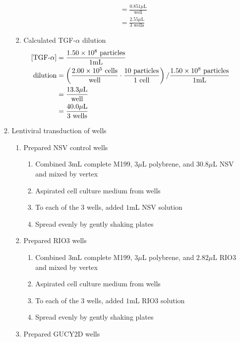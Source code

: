 \begin{enumerate}
\begin{enumerate}
\begin{enumerate}
\begin{align*}
							&= \frac{0.851\mu\text{L}}{\text{well}}\\
							&= \frac{2.55\mu\text{L}}{3\text{ wells}}
						\end{align*}
					\item Calculated TGF-$\alpha$ dilution
							\begin{align*}
							\text{[TGF-$\alpha$]} &= \frac{1.50\times 10^{8}\text{ particles}}{1\text{mL}}\\
							\text{dilution}&= \left(\frac{2.00\times 10^{5}\text{ cells}}{\text{well}}\cdot \frac{10\text{ particles}}{1\text{ cell}}\right)/\frac{1.50\times 10^{8}\text{ particles}}{1\text{mL}}\\
							&= \frac{13.3\mu\text{L}}{\text{well}}\\
							&= \frac{40.0\mu\text{L}}{3\text{ wells}}
						\end{align*}
				\end{enumerate}
			\item Lentiviral transduction of wells
				\begin{enumerate}
					\item Prepared NSV control wells
						\begin{enumerate}
							\item Combined $3$mL complete M199, $3\mu$L polybrene, and $30.8\mu$L NSV and mixed by vertex
							\item Aspirated cell culture medium from wells
							\item To each of the 3 wells, added $1$mL NSV solution
							\item Spread evenly by gently shaking plates
						\end{enumerate}
					\item Prepared RIO3 wells
						\begin{enumerate}
							\item Combined $3$mL complete M199, $3\mu$L polybrene, and $2.82\mu$L RIO3 and mixed by vertex
							\item Aspirated cell culture medium from wells
							\item To each of the 3 wells, added $1$mL RIO3 solution
							\item Spread evenly by gently shaking plates
						\end{enumerate}
					\item Prepared GUCY2D wells
						\begin{enumerate}

\end{enumerate}
\end{enumerate}
\end{enumerate}
\end{enumerate}
